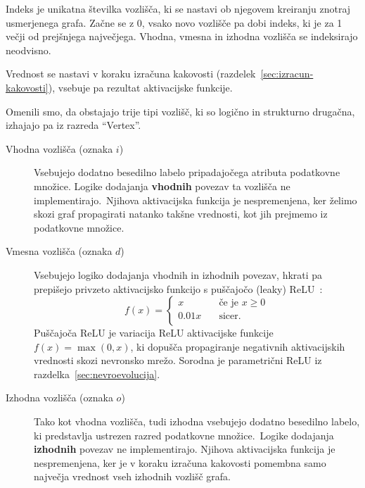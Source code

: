 \documentclass[a4paper,12pt,openright]{book}
\begin{document}
    Indeks je unikatna številka vozlišča, ki se nastavi ob njegovem kreiranju znotraj usmerjenega grafa.
    Začne se z 0, vsako novo vozlišče pa dobi indeks, ki je za 1 večji od prejšnjega največjega.
    Vhodna, vmesna in izhodna vozlišča se indeksirajo neodvisno.

    Vrednost se nastavi v koraku izračuna kakovosti (razdelek~\ref{sec:izracun-kakovosti}), vsebuje pa rezultat aktivacijske funkcije.

    Omenili smo, da obstajajo trije tipi vozlišč, ki so logično in strukturno drugačna, izhajajo
    pa iz razreda \enquote{Vertex}.
    \begin{description}
        \item[Vhodna vozlišča (oznaka $i$)]{Vsebujejo dodatno besedilno labelo pripadajočega atributa podatkovne množice.
        Logike dodajanja \textbf{vhodnih} povezav ta vozlišča ne implementirajo.\ Njihova aktivacijska funkcija je nespremenjena, ker
        želimo skozi graf propagirati natanko takšne vrednosti, kot jih prejmemo iz podatkovne množice. }
        \item[Vmesna vozlišča (oznaka $d$)]{Vsebujejo logiko dodajanja vhodnih in izhodnih povezav, hkrati pa prepišejo
        privzeto aktivacijsko funkcijo s puščajočo (leaky) ReLU~\cite{maas2013rectifier}:
        \begin{equation}
            f(x)=
            \begin{cases}
                x & \quad\text{če je } x\ge0\\
                0.01x & \quad\text{sicer}.\\
            \end{cases}
            \label{eq:leaky_relu}
        \end{equation}
        Puščajoča ReLU je variacija ReLU aktivacijske funkcije $f(x)=\max(0,x)$, ki dopušča propagiranje negativnih aktivacijskih
        vrednosti skozi nevronsko mrežo. Sorodna je parametrični ReLU iz razdelka~\ref{sec:nevroevolucija}.}
        \item[Izhodna vozlišča (oznaka $o$)]{Tako kot vhodna vozlišča, tudi izhodna vsebujejo dodatno besedilno labelo, ki predstavlja
        ustrezen razred podatkovne mno\-ži\-ce.\ Logike dodajanja \textbf{izhodnih} povezav ne implementirajo.
        Njihova aktivacijska funkcija je nespremenjena, ker je v koraku izračuna kakovosti pomembna samo največja
        vrednost vseh izhodnih vozlišč grafa. }
    \end{description}
\end{document}
